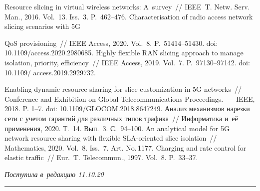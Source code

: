 \begin{multicols}{2}
{{\begin{thebibliography}{99}
 Resource slicing in virtual wireless 
networks: A~survey~// IEEE~T. Netw. Serv. Man., 2016. Vol.~13. Iss.~3.  
P.~462--476.
 Characterisation 
of radio access network slicing scenarios with 5G\linebreak
\vspace*{-12pt}
\pagebreak

\noindent
QoS provisioning~// IEEE Access, 2020. 
Vol.~8. P.~51414--51430. doi: 10.1109/access.2020.2980685.
 Highly flexible RAN slicing approach to manage isolation, 
priority, efficiency~// IEEE Access, 2019. Vol.~7. P.~97130--97142. doi: 
10.1109/ \mbox{access}.2019.2929732.

 Enabling dynamic resource sharing for slice 
customization in 5G networks~// Conference and Exhibition on Global Telecommunications 
Proceedings.~--- IEEE, 2018. P. 1--7. doi: 
10.1109/\mbox{GLOCOM}.2018.8647249. 
Анализ механизмов нарезки сети с учетом гарантий для различных типов 
трафика~// Информатика и~её применения, 2020. Т.~14. Вып.~3. С.~94--100.
 An analytical model for 
5G network resource sharing with flexible SLA-oriented slice isolation~// Mathematics, 2020. 
Vol.~8. Iss.~7. Art. No.\,1177.
 Charging and rate control for elastic traffic~// Eur.~T. Telecommun., 1997. 
Vol.~8. P.~33--37.
\end{thebibliography}

 }
 }

\end{multicols}

\vspace*{-5pt}

\hfill{\small\textit{Поступила в~редакцию 11.10.20}}

\vspace*{8pt}




\hrule

\vspace*{2pt}

